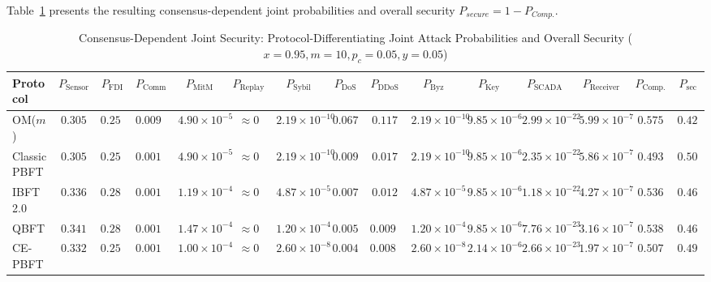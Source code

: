 \documentclass[10pt,twocolumn,journal]{IEEEtran}
\begin{document}
Table~\ref{tab:consensus_security} presents the resulting consensus-dependent joint probabilities and overall security $P_{secure} = 1 - P_{Comp.}$.

\begin{table}[t]
\caption{Consensus-Dependent Joint Security: Protocol-Differentiating Joint Attack Probabilities and Overall Security ($x{=}0.95, m{=}10, p_c{=}0.05, y{=}0.05$)}
\label{tab:consensus_security}
\centering
\scriptsize
\setlength{\tabcolsep}{2.5pt}
\begin{tabular}{@{}l|cccccccccccc|cc@{}}
\toprule
\textbf{Protocol} & \textbf{$P_{\mathrm{Sensor}}$} & \textbf{$P_{\mathrm{FDI}}$} & \textbf{$P_{\mathrm{Comm}}$} & \textbf{$P_{\mathrm{MitM}}$} & \textbf{$P_{\mathrm{Replay}}$} & \textbf{$P_{\mathrm{Sybil}}$} & \textbf{$P_{\mathrm{DoS}}$} & \textbf{$P_{\mathrm{DDoS}}$} & \textbf{$P_{\mathrm{Byz}}$} & \textbf{$P_{\mathrm{Key}}$} & \textbf{$P_{\mathrm{SCADA}}$} & \textbf{$P_{\mathrm{Receiver}}$} & \textbf{$P_{\mathrm{Comp.}}$} & \textbf{$P_{\mathrm{sec}}$} \\
\midrule
OM($m$) & $0.305$ & $0.251$ & $0.0099$ & $4.90{\times}10^{-5}$ & $\approx 0$ & $2.19{\times}10^{-10}$ & $0.067$ & $0.117$ & $2.19{\times}10^{-10}$ & $9.85{\times}10^{-6}$ & $2.99{\times}10^{-22}$ & $5.99{\times}10^{-7}$ & \textbf{$0.575$} & \textbf{$0.425$} \\
Classic PBFT & $0.305$ & $0.251$ & $0.0014$ & $4.90{\times}10^{-5}$ & $\approx 0$ & $2.19{\times}10^{-10}$ & $0.0095$ & $0.017$ & $2.19{\times}10^{-10}$ & $9.85{\times}10^{-6}$ & $2.35{\times}10^{-22}$ & $5.86{\times}10^{-7}$ & \textbf{$0.493$} & \textbf{$0.507$} \\
IBFT 2.0 & $0.336$ & $0.287$ & $0.0011$ & $1.19{\times}10^{-4}$ & $\approx 0$ & $4.87{\times}10^{-5}$ & $0.0070$ & $0.012$ & $4.87{\times}10^{-5}$ & $9.85{\times}10^{-6}$ & $1.18{\times}10^{-22}$ & $4.27{\times}10^{-7}$ & \textbf{$0.536$} & \textbf{$0.464$} \\
QBFT & $0.341$ & $0.287$ & $0.0010$ & $1.47{\times}10^{-4}$ & $\approx 0$ & $1.20{\times}10^{-4}$ & $0.0056$ & $0.0097$ & $1.20{\times}10^{-4}$ & $9.85{\times}10^{-6}$ & $7.76{\times}10^{-23}$ & $3.16{\times}10^{-7}$ & \textbf{$0.538$} & \textbf{$0.462$} \\
CE-PBFT & $0.332$ & $0.251$ & $0.0012$ & $1.00{\times}10^{-4}$ & $\approx 0$ & $2.60{\times}10^{-8}$ & $0.0048$ & $0.0083$ & $2.60{\times}10^{-8}$ & $2.14{\times}10^{-6}$ & $2.66{\times}10^{-23}$ & $1.97{\times}10^{-7}$ & \textbf{$0.507$} & \textbf{$0.493$} \\

\end{tabular}
\end{table}
\end{document}
